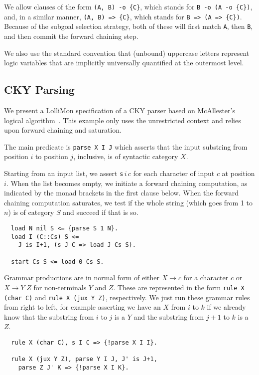 \documentclass{sig-alt}
\begin{document}
We allow clauses of the form \verb"(A, B) -o {C}", which stands
for \verb"B -o (A -o {C})", and, in a similar manner,
\verb"(A, B) => {C}", which stands for \verb"B => (A => {C})".
Because of the subgoal selection strategy,
both of these will first match \verb"A", then \verb"B", and
then commit the forward chaining step.

We also use the standard convention that (unbound) uppercase letters
represent logic variables that are implicitly universally quantified
at the outermost level.

\subsection{CKY Parsing}
\label{ssec:cky}
We present a LolliMon specification of a CKY parser based on
McAllester's logical algorithm~\cite{Mcallester02jacm}.
This example only uses the
unrestricted context and relies upon forward chaining and saturation.

The main predicate is \texttt{parse X I J} which asserts
that the input substring from position $i$ to position $j$, inclusive, is of
syntactic category $X$.

Starting from an input list,
we assert \texttt{s}$\,i\,c$ for each character of input $c$ at
position $i$.  When the list becomes empty, we initiate a forward
chaining computation, as indicated by the monad brackets in the first
clause below.  When the forward chaining computation saturates, we
test if the whole string (which goes from 1 to $n$) is of category $S$
and succeed if that is so.

\begin{small}\begin{verbatim}
  load N nil S <= {parse S 1 N}.
  load I (C::Cs) S <= 
    J is I+1, (s J C => load J Cs S).

  start Cs S <= load 0 Cs S.
\end{verbatim}\end{small}

Grammar productions are in normal form of either
$X \rightarrow c$ for a character $c$ or
$X \rightarrow Y\; Z$ for non-terminals $Y$ and $Z$.
These are represented in the form \texttt{rule X (char C)}
and \texttt{rule X (jux Y Z)}, respectively.  We
just run these grammar rules from right to left,
for example asserting we have an $X$ from $i$ to $k$ if
we already know that the substring from $i$ to $j$
is a $Y$ and the substring from $j+1$ to $k$ is a $Z$.

\begin{small}\begin{verbatim}
  rule X (char C), s I C => {!parse X I I}.

  rule X (jux Y Z), parse Y I J, J' is J+1, 
    parse Z J' K => {!parse X I K}.
\end{verbatim}\end{small}
\end{document}
